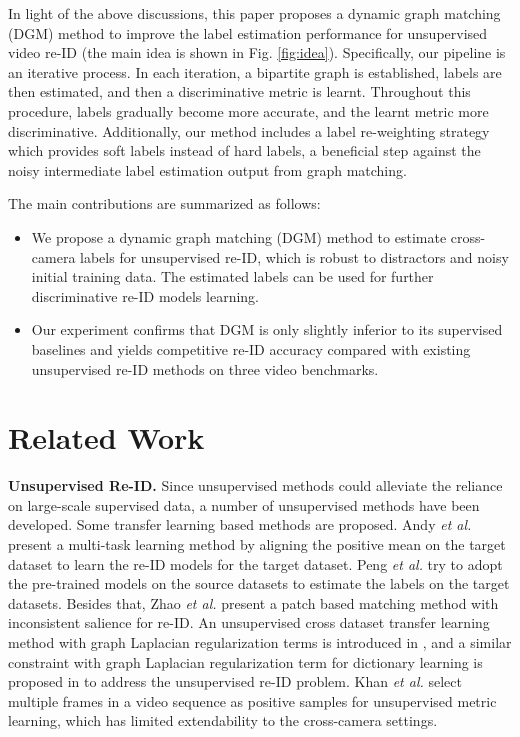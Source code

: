 \documentclass[10pt,twocolumn,letterpaper]{article}
\begin{document}
In light of the above discussions, this paper proposes a dynamic graph matching (DGM) method to improve the label estimation performance for unsupervised video re-ID (the main idea is shown in Fig. \ref{fig:idea}). Specifically, our pipeline is an iterative process. In each iteration, a bipartite graph is established, labels are then estimated, and then a discriminative metric is learnt. Throughout this procedure, labels gradually become more accurate, and the learnt metric more discriminative. Additionally, our method includes a label re-weighting strategy which provides soft labels instead of hard labels, a beneficial step against the noisy intermediate label estimation output from graph matching.

The main contributions are summarized as follows:
\begin{itemize}
\item We propose a dynamic graph matching (DGM) method to estimate cross-camera labels for unsupervised re-ID, which is robust to distractors and noisy initial training data. The estimated labels can be used for further discriminative re-ID models learning.
\item Our experiment confirms that DGM is only slightly inferior to its supervised baselines and yields competitive re-ID accuracy compared with existing unsupervised re-ID methods on three video benchmarks.
 \end{itemize}
\section{Related Work}
\textbf{Unsupervised Re-ID.}
Since unsupervised methods could alleviate the reliance on large-scale supervised data, a number of unsupervised methods have been developed. Some transfer learning based methods \cite{cvpr16un,iccv13ma,cvpr17un} are proposed. Andy \emph{et al.} \cite{iccv13ma} present a multi-task learning method by aligning the positive mean on the target dataset to learn the re-ID models for the target dataset. Peng \emph{et al.} \cite{cvpr16un} try to adopt the pre-trained models on the source datasets to estimate the labels on the target datasets. Besides that, Zhao \emph{et al.} \cite{cvpr13saliency} present a patch based matching method with inconsistent salience for re-ID. An unsupervised cross dataset transfer learning method with graph Laplacian regularization terms is introduced in \cite{cvpr16un}, and a similar constraint with graph Laplacian regularization term for dictionary learning is proposed in \cite{eccv16un} to address the unsupervised re-ID problem. Khan \emph{et al.} \cite{avss16reid} select multiple frames in a video sequence as positive samples for unsupervised metric learning, which has limited extendability to the cross-camera settings.
\end{document}
